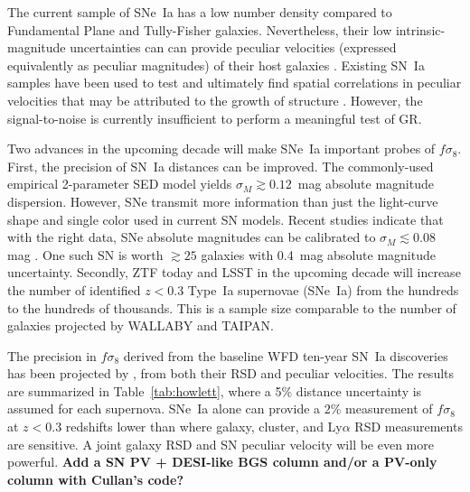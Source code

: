 \documentclass{aastex62}   	%
\begin{document}
The current sample of SNe~Ia has a low number density compared to Fundamental Plane and Tully-Fisher galaxies.
Nevertheless, their low intrinsic-magnitude uncertainties can 
can provide peculiar velocities (expressed equivalently as peculiar magnitudes)
of their host galaxies \citep{2006PhRvD..73l3526H,2011ApJ...741...67D}.  Existing SN~Ia samples
have been used to test and ultimately find spatial correlations in peculiar velocities that may be attributed to the growth of structure
\citep{2008MNRAS.389L..47A,2015JCAP...12..033H, 2017JCAP...05..015H}.
However, the signal-to-noise is currently insufficient to perform a meaningful test of GR.

Two advances in the upcoming decade will make SNe~Ia  important probes of $f\sigma_8$.
First, the precision of SN~Ia distances can be improved.  The commonly-used empirical 2-parameter SED model yields $\sigma_M \gtrsim 0.12$~mag absolute magnitude
dispersion.  However, SNe transmit more information than just the light-curve shape and single color used in current SN models.
Recent studies indicate that with the right data, SNe absolute
magnitudes can be calibrated to $\sigma_M \lesssim 0.08$ mag \citep[see e.g.][]{2012MNRAS.425.1007B, 2015ApJ...815...58F}.
One such SN is worth $\gtrsim 25$ galaxies with 0.4~mag absolute magnitude uncertainty.
Secondly,  ZTF today and LSST in the upcoming decade will increase the number of identified  $z<0.3$ Type~Ia supernovae (SNe~Ia)  from the hundreds to the
hundreds of thousands.  This is a sample size comparable to the number of galaxies projected by WALLABY and TAIPAN.

The precision in  $f\sigma_8$ derived from the baseline WFD ten-year SN~Ia discoveries has been projected by \citet{2017ApJ...847..128H},
from both their RSD and peculiar velocities.
The results are summarized in Table~\ref{tab:howlett}, where a 5\% distance uncertainty is assumed for each supernova.
SNe~Ia alone can provide a $2\%$ measurement of $f\sigma_8$ at $z<0.3$ redshifts lower than where galaxy, cluster, and Ly$\alpha$
RSD measurements are sensitive.  A joint galaxy RSD and SN peculiar velocity will be even more powerful.
{\bf Add a SN PV + DESI-like BGS column and/or a PV-only column with Cullan's code? }
\end{document}
